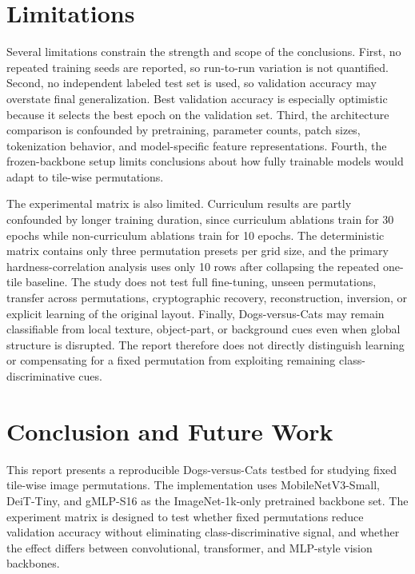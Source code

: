\documentclass[12pt]{article}
\begin{document}
\section{Limitations}

Several limitations constrain the strength and scope of the conclusions. First, no repeated training seeds are reported, so run-to-run variation is not quantified. Second, no independent labeled test set is used, so validation accuracy may overstate final generalization. Best validation accuracy is especially optimistic because it selects the best epoch on the validation set. Third, the architecture comparison is confounded by pretraining, parameter counts, patch sizes, tokenization behavior, and model-specific feature representations. Fourth, the frozen-backbone setup limits conclusions about how fully trainable models would adapt to tile-wise permutations.

The experimental matrix is also limited. Curriculum results are partly confounded by longer training duration, since curriculum ablations train for 30 epochs while non-curriculum ablations train for 10 epochs. The deterministic matrix contains only three permutation presets per grid size, and the primary hardness-correlation analysis uses only 10 rows after collapsing the repeated one-tile baseline. The study does not test full fine-tuning, unseen permutations, transfer across permutations, cryptographic recovery, reconstruction, inversion, or explicit learning of the original layout. Finally, Dogs-versus-Cats may remain classifiable from local texture, object-part, or background cues even when global structure is disrupted. The report therefore does not directly distinguish learning or compensating for a fixed permutation from exploiting remaining class-discriminative cues.

\section{Conclusion and Future Work}

This report presents a reproducible Dogs-versus-Cats testbed for studying fixed tile-wise image permutations. The implementation uses MobileNetV3-Small, DeiT-Tiny, and gMLP-S16 as the ImageNet-1k-only pretrained backbone set. The experiment matrix is designed to test whether fixed permutations reduce validation accuracy without eliminating class-discriminative signal, and whether the effect differs between convolutional, transformer, and MLP-style vision backbones.
\end{document}
